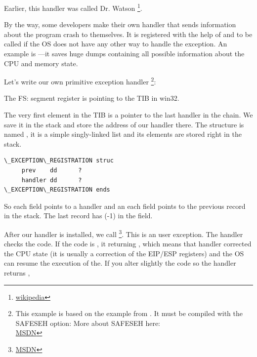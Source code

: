 Earlier, this handler was called Dr. Watson
\footnote{\href{http://go.yurichev.com/17046}{wikipedia}}.

By the way, some developers make their own handler that sends information about the program crash to themselves.
It is registered with the help of  
and to be called if the \ac{OS} does not have any other way to handle the exception.
\myindex{\oracle}
An example is \oracle---it saves huge dumps containing all possible information about the \ac{CPU} and memory state.

Let's write our own primitive exception handler
\footnote{
	This example is based on the example from \cite{PietrekSEH}.
	It must be compiled with the SAFESEH option: 
	More about SAFESEH here: \\
	\href{http://go.yurichev.com/17252}{MSDN}
}:
	


The FS: segment register is pointing to the \ac{TIB} in win32.

The very first element in the \ac{TIB} is a pointer to the last handler in the chain.
We save it in the stack and store the address of our handler there.
The structure is named , it is a simple singly-linked list and its elements are stored right in the stack.

\begin{lstlisting}[caption=MSVC/VC/crt/src/exsup.inc]
\_EXCEPTION\_REGISTRATION struc
     prev    dd      ?
     handler dd      ?
\_EXCEPTION\_REGISTRATION ends
\end{lstlisting}

So each  field points to a handler and an each  field points to the previous record in the stack.
The last record has  (-1) in the  field.



After our handler is installed, we call 
\footnote{\href{http://go.yurichev.com/17253}{MSDN}}.
This is an user exception. 
The handler checks the code.
If the code is , it returning ,
which means that handler corrected the CPU state (it is usually a correction of the EIP/ESP registers) and the \ac{OS} can resume the execution of the.
If you alter slightly the code so the handler returns ,

